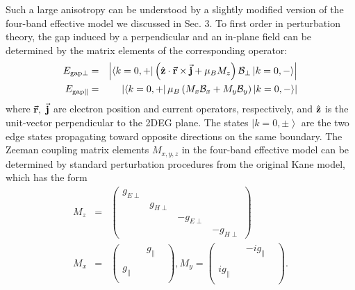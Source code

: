 \documentclass{article}
\begin{document}
Such a large anisotropy can be understood by a slightly modified
version of the four-band effective model we discussed in Sec. 3. To
 first order in perturbation theory, the gap induced by a perpendicular
and an in-plane field can be determined by the matrix elements of
the corresponding operator:
\begin{eqnarray}
E_{\rm gap\perp}&=&\left|\left\langle k=0,+\right|\left(\hat{\bf
z}\cdot\vec{\bf r}\times{\vec{\bf
j}}+ \mu_BM_z\right)\mathcal{B}_{\perp}\left|k=0,-\right\rangle\right|\nonumber\\
E_{\rm gap\parallel}&=&\left|\left\langle k=0,+\right|\mu_B\left(M_x
\mathcal{B}_x+M_y\mathcal{B}_y\right)\left|k=0,-\right\rangle
\right|
\end{eqnarray}
where $\vec{\bf r},~\vec{\bf j}$ are electron position and current
operators, respectively, and $\hat{\bf z}$ is the unit-vector
perpendicular to the 2DEG plane. The states
$\left|k=0,\pm\right\rangle$ are the two edge states propagating
toward opposite directions on the same boundary. The Zeeman
coupling matrix elements $M_{x,y,z}$ in the four-band effective
model can be determined by standard perturbation procedures from
the original Kane model, which has the form\cite{hughes2007}
\begin{eqnarray}
M_z&=&\left(\begin{array}{cccc}g_{E\perp}&&&\\&g_{H\perp}&&\\&&-g_{E\perp}&\\&&&-g_{H\perp}\end{array}\right)\nonumber\\
M_x&=&\left(\begin{array}{cccc}&&g_\parallel&\\&&&\\g_\parallel&&&\\&&&\end{array}\right),
M_y=\left(\begin{array}{cccc}&&-ig_\parallel&\\&&&\\ig_\parallel&&&\\&&&\end{array}\right).
\end{eqnarray}
\end{document}
